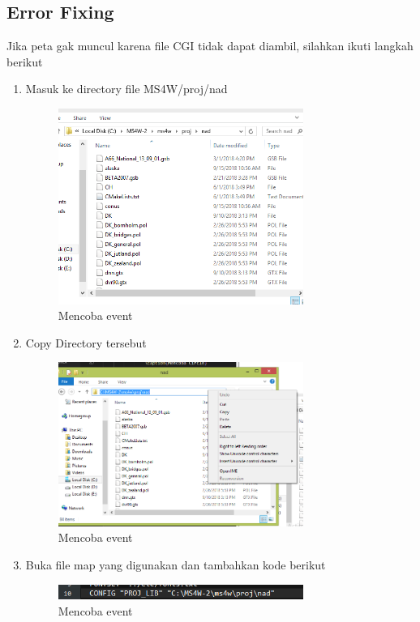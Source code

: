 \subsection{Error Fixing}
Jika peta gak muncul karena file CGI tidak dapat diambil, silahkan ikuti langkah berikut
\begin{enumerate}
    \item Masuk ke directory file MS4W/proj/nad
    \hfill\break
    \begin{figure}[H]
        \includegraphics[width=8cm]{figures/1174035/tugas5/error_1.png}
        \centering
        \caption{Mencoba event}
    \end{figure}
    \item Copy Directory tersebut
    \hfill\break
    \begin{figure}[H]
        \includegraphics[width=8cm]{figures/1174035/tugas5/error_2.png}
        \centering
        \caption{Mencoba event}
    \end{figure}
    \item Buka file map yang digunakan dan tambahkan kode berikut
    \hfill\break
    \begin{figure}[H]
        \includegraphics[width=8cm]{figures/1174035/tugas5/error_3.png}
        \centering
        \caption{Mencoba event}
    \end{figure}
\end{enumerate}
